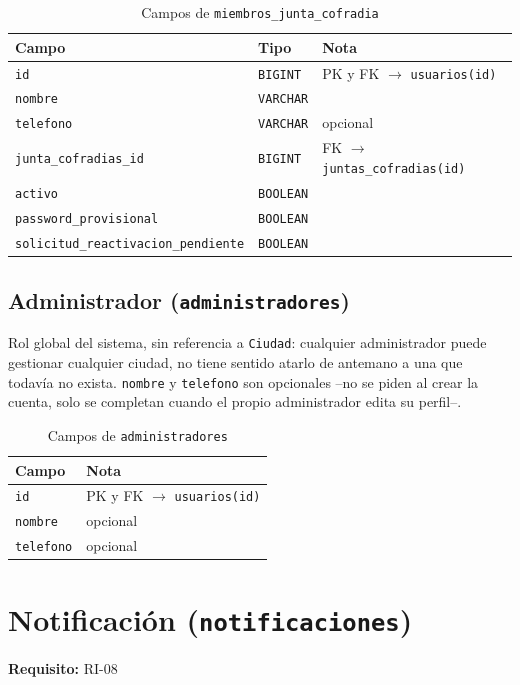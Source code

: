 \begin{table}[H]
\centering
\begin{tabular}{|l|l|p{7cm}|}
\hline
\textbf{Campo} & \textbf{Tipo} & \textbf{Nota} \\
\hline
\texttt{id} & \texttt{BIGINT} & PK y FK $\to$ \texttt{usuarios(id)} \\
\hline
\texttt{nombre} & \texttt{VARCHAR} &  \\
\hline
\texttt{telefono} & \texttt{VARCHAR} & opcional \\
\hline
\texttt{junta\_cofradias\_id} & \texttt{BIGINT} & FK $\to$ \texttt{juntas\_cofradias(id)} \\
\hline
\texttt{activo} & \texttt{BOOLEAN} &  \\
\hline
\texttt{password\_provisional} & \texttt{BOOLEAN} &  \\
\hline
\texttt{solicitud\_reactivacion\_pendiente} & \texttt{BOOLEAN} &  \\
\hline
\end{tabular}
\caption{Campos de \texttt{miembros\_junta\_cofradia}}
\end{table}

\subsection{Administrador (\texttt{administradores})}
Rol global del sistema, sin referencia a \texttt{Ciudad}: cualquier administrador puede gestionar cualquier ciudad, no tiene sentido atarlo de antemano a una que todavía no exista. \texttt{nombre} y \texttt{telefono} son opcionales --no se piden al crear la cuenta, solo se completan cuando el propio administrador edita su perfil--.

\begin{table}[H]
\centering
\begin{tabular}{|l|p{7cm}|}
\hline
\textbf{Campo} & \textbf{Nota} \\
\hline
\texttt{id} & PK y FK $\to$ \texttt{usuarios(id)} \\
\hline
\texttt{nombre} & opcional \\
\hline
\texttt{telefono} & opcional \\
\hline
\end{tabular}
\caption{Campos de \texttt{administradores}}
\end{table}

\section{Notificación (\texttt{notificaciones})}
\textbf{Requisito:} RI-08

